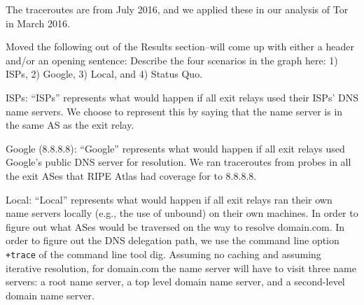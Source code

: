 The traceroutes are from July 2016, and we applied these in our analysis of Tor 
in March 2016.   


Moved the following out of the Results section--will come up with either a header and/or an 
opening sentence:
Describe the four scenarios in the graph here: 1) ISPs, 2) Google, 3) Local, and 
4) Status Quo.

ISPs: ``ISPs'' represents what would happen if all exit relays used their ISPs' DNS name 
servers.  We choose to represent this by saying that the name server is in the same AS as the 
exit relay.

Google (8.8.8.8): ``Google'' represents what would happen if all exit relays used 
Google's public DNS server for resolution. We ran traceroutes from probes in all the exit 
ASes that RIPE Atlas had coverage for to 8.8.8.8.

Local: ``Local'' represents what would happen if all exit relays ran their own name 
servers locally (e.g., the use of unbound) on their own machines. In order to figure out 
what ASes would be traversed on the way to resolve domain.com. In order to figure out the 
DNS delegation path, we use the command line option \texttt{+trace} of the
command line tool dig. Assuming no caching and assuming 
iterative resolution, for domain.com the name server will have to visit three name servers:
a root name server, a top level domain name server, and a second-level domain name server. 

